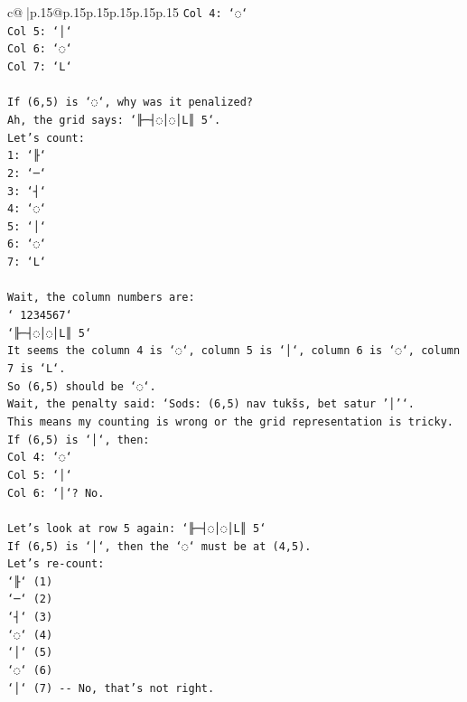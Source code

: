 \documentclass{article}
\begin{document}
{\begin{supertabular}{c@{$\;$}|p{.15\linewidth}@{}p{.15\linewidth}p{.15\linewidth}p{.15\linewidth}p{.15\linewidth}p{.15\linewidth}}
{{{\texttt{Col 4: `◌`} \\
\texttt{Col 5: `│`} \\
\texttt{Col 6: `◌`} \\
\texttt{Col 7: `L`} \\
\\ 
\texttt{If (6,5) is `◌`, why was it penalized?} \\
\texttt{Ah, the grid says: `╟─┤◌│◌│L║ 5`.} \\
\texttt{Let's count:} \\
\texttt{1: `╟`} \\
\texttt{2: `─`} \\
\texttt{3: `┤`} \\
\texttt{4: `◌`} \\
\texttt{5: `│`} \\
\texttt{6: `◌`} \\
\texttt{7: `L`} \\
\\ 
\texttt{Wait, the column numbers are:} \\
\texttt{` 1234567`} \\
\texttt{`╟─┤◌│◌│L║ 5`} \\
\texttt{It seems the column 4 is `◌`, column 5 is `│`, column 6 is `◌`, column 7 is `L`.} \\
\texttt{So (6,5) should be `◌`.} \\
\texttt{Wait, the penalty said: `Sods: (6,5) nav tukšs, bet satur '│'`.} \\
\texttt{This means my counting is wrong or the grid representation is tricky.} \\
\texttt{If (6,5) is `│`, then:} \\
\texttt{Col 4: `◌`} \\
\texttt{Col 5: `│`} \\
\texttt{Col 6: `│`? No.} \\
\\ 
\texttt{Let's look at row 5 again: `╟─┤◌│◌│L║ 5`} \\
\texttt{If (6,5) is `│`, then the `◌` must be at (4,5).} \\
\texttt{Let's re{-}count:} \\
\texttt{`╟` (1)} \\
\texttt{`─` (2)} \\
\texttt{`┤` (3)} \\
\texttt{`◌` (4)} \\
\texttt{`│` (5)} \\
\texttt{`◌` (6)} \\
\texttt{`│` (7) {-}{-} No, that's not right.} \\
}}}
\end{supertabular}}
\end{document}
